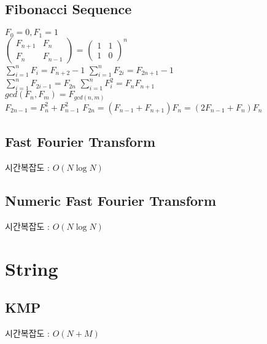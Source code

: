 \documentclass[10pt,landscape,a4paper,twocolumn]{article}
\begin{document}
\subsection{Fibonacci Sequence}
$F_0=0, F_1=1$\\

$
\begin{pmatrix}
    F_{n+1} & F_n \\
    F_n & F_{n-1}
\end{pmatrix}
$
=
$
\begin{pmatrix}
    1 & 1 \\
    1 & 0
\end{pmatrix}^n
$\\


$\sum_{i=1}^n F_i=F_{n+2}-1$
\hspace{10em}
$\sum_{i=1}^n F_{2i}=F_{2n+1}-1$\\

$\sum_{i=1}^n F_{2i-1}=F_{2n}$
\hspace{11em}
$\sum_{i=1}^n F_i^2=F_nF_{n+1}$\\

$gcd(F_n,F_m)=F_{gcd(n,m)}$\\

$F_{2n-1}=F_n^2+F_{n-1}^2$
\hspace{10em}
$F_{2n}=(F_{n-1}+F_{n+1})F_n=(2F_{n-1}+F_n)F_n$\\

\subsection{Fast Fourier Transform}
시간복잡도 : $O(N\log{N})$


\subsection{Numeric Fast Fourier Transform}
시간복잡도 : $O(N\log{N})$




\section{String}
\subsection{KMP}
시간복잡도 : $O(N+M)$

\end{document}
